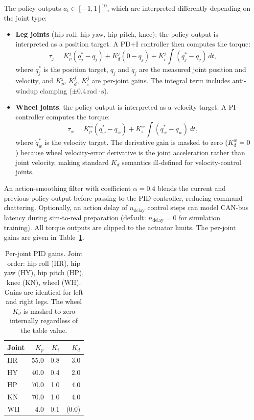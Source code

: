 \documentclass[conference]{IEEEtran}
\begin{document}
The policy outputs $a_t \in [-1,1]^{10}$, which are interpreted differently
depending on the joint type:
\begin{itemize}
    \item \textbf{Leg joints} (hip roll, hip yaw, hip pitch, knee):
    the policy output is interpreted as a position target.
    A PD+I controller then computes the torque:
    \begin{equation}
    \tau_j = K_p^j (q_j^* - q_j)
             + K_d^j (0 - \dot{q}_j)
             + K_i^j \int (q_j^* - q_j)\, dt,
    \end{equation}
    where $q_j^*$ is the position target, $q_j$ and $\dot{q}_j$ are the
    measured joint position and velocity, and $K_p^j$, $K_d^j$, $K_i^j$
    are per-joint gains.
    The integral term includes anti-windup clamping
    ($\pm 0.4\,\mathrm{rad}{\cdot}\mathrm{s}$).
    \item \textbf{Wheel joints}: the policy output is interpreted as a
    velocity target.
    A PI controller computes the torque:
    \begin{equation}
    \tau_w = K_p^w (\dot{q}_w^* - \dot{q}_w)
             + K_i^w \int (\dot{q}_w^* - \dot{q}_w)\, dt,
    \end{equation}
    where $\dot{q}_w^*$ is the velocity target.
    The derivative gain is masked to zero ($K_d^w = 0$) because wheel
    velocity-error derivative is the joint acceleration rather than
    joint velocity, making standard $K_d$ semantics ill-defined for
    velocity-control joints.
\end{itemize}

An action-smoothing filter with coefficient $\alpha = 0.4$
blends the current and previous policy output before passing to the PID
controller, reducing command chattering.
Optionally, an action delay of $n_{\mathrm{delay}}$ control steps can
model CAN-bus latency during sim-to-real preparation
(default: $n_{\mathrm{delay}} = 0$ for simulation training).
All torque outputs are clipped to the actuator limits.
The per-joint gains are given in Table~\ref{tab:pid_gains}.

\begin{table}[t]
\centering
\caption{Per-joint PID gains. Joint order: hip roll (HR), hip yaw (HY),
hip pitch (HP), knee (KN), wheel (WH). Gains are identical for left
and right legs.
The wheel $K_d$ is masked to zero internally regardless of the table value.}
\label{tab:pid_gains}
\begin{tabular}{l r r r}
\toprule
Joint & $K_p$ & $K_i$ & $K_d$ \\
\midrule
HR   & 55.0 & 0.8 & 3.0 \\
HY   & 40.0 & 0.4 & 2.0 \\
HP   & 70.0 & 1.0 & 4.0 \\
KN   & 70.0 & 1.0 & 4.0 \\
WH   &  4.0 & 0.1 & (0.0) \\
\bottomrule
\end{tabular}
\end{table}
\end{document}
